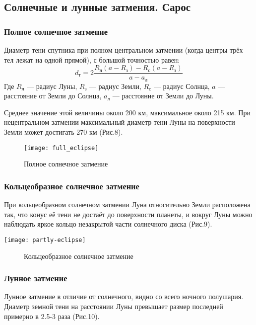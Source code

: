 \subsection{Солнечные и лунные затмения. Сарос}
\subsubsection{Полное солнечное затмение}
Диаметр тени спутника при полном центральном затмении (когда центры трёх тел 
лежат на одной прямой), с большой точностью равен:
\begin{equation}d_\text{т}=2\frac{R_\text{л}(a-R_\text{з})-R_\text{с}(a-R_\text{
з})}{a-a_\text{л}}
\end{equation}
Где $R_\text{л}$ --- радиус Луны, $R_\text{з}$ --- радиус Земли, $R_\text{с}$ 
--- радиус Солнца, $a$ --- расстояние от Земли до Солнца, $a_\text{л}$ --- 
расстояние от Земли до Луны.

Среднее значение  этой величины около 200 км, максимальное около 215 км. При 
нецентральном затмении максимальный диаметр тени Луны на поверхности Земли 
может достигать 270 км (Рис.8).

\begin{figure}[h!]
\texttt{[image: full\_eclipse]}
\caption{Полное солнечное затмение}
\end{figure}

\subsubsection{Кольцеобразное солнечное затмение}
При кольцеобразном солнечном затмении Луна относительно Земли расположена так, 
что конус её тени не достаёт до поверхности планеты, и вокруг Луны можно 
наблюдать яркое кольцо незакрытой части солнечного диска (Рис.9).
\begin{center}
\texttt{[image: partly-eclipse]}
\begin{figure}[h!]
\caption{Кольцеобразное солнечное затмение}
\end{figure}
\end{center}
\subsubsection{Лунное затмение}

Лунное затмение в отличие от солнечного, видно со всего ночного полушария. 
Диаметр земной тени на расстоянии Луны превышает размер последней примерно в 
2.5-3 раза (Рис.10).

